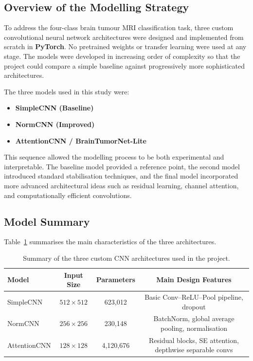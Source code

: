 \documentclass{article}
\begin{document}
\subsection{Overview of the Modelling Strategy}

To address the four-class brain tumour MRI classification task, three custom convolutional neural network architectures were designed and implemented from scratch in \textbf{PyTorch}. No pretrained weights or transfer learning were used at any stage. The models were developed in increasing order of complexity so that the project could compare a simple baseline against progressively more sophisticated architectures.

The three models used in this study were:
\begin{itemize}
    \item \textbf{SimpleCNN (Baseline)}
    \item \textbf{NormCNN (Improved)}
    \item \textbf{AttentionCNN / BrainTumorNet-Lite}
\end{itemize}

This sequence allowed the modelling process to be both experimental and interpretable. The baseline model provided a reference point, the second model introduced standard stabilisation techniques, and the final model incorporated more advanced architectural ideas such as residual learning, channel attention, and computationally efficient convolutions.

\subsection{Model Summary}

Table~\ref{tab:model_summary} summarises the main characteristics of the three architectures.

\begin{table}[H]
\centering
\caption{Summary of the three custom CNN architectures used in the project.}
\label{tab:model_summary}
\begin{tabular}{lccc}
\toprule
\textbf{Model} & \textbf{Input Size} & \textbf{Parameters} & \textbf{Main Design Features} \\
\midrule
SimpleCNN      & $512 \times 512$ & 623,012   & Basic Conv--ReLU--Pool pipeline, dropout \\
NormCNN        & $256 \times 256$ & 230,148   & BatchNorm, global average pooling, normalisation \\
AttentionCNN   & $128 \times 128$ & 4,120,676 & Residual blocks, SE attention, depthwise separable convs \\
\bottomrule
\end{tabular}
\end{table}
\end{document}
